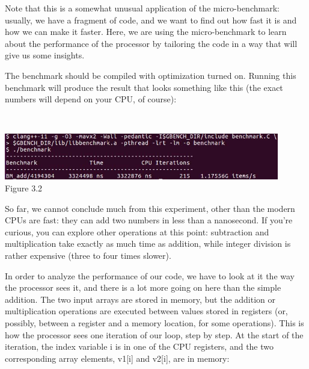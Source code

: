 Note that this is a somewhat unusual application of the micro-benchmark: usually, we have a fragment of code, and we want to find out how fast it is and how we can make it faster. Here, we are using the micro-benchmark to learn about the performance of the processor by tailoring the code in a way that will give us some insights.

The benchmark should be compiled with optimization turned on. Running this benchmark will produce the result that looks something like this (the exact numbers will depend on your CPU, of course):

\hspace*{\fill} \\ %
\begin{center}
\includegraphics[width=0.9\textwidth]{content/1/chapter3/images/2.jpg}\\
Figure 3.2
\end{center}

So far, we cannot conclude much from this experiment, other than the modern CPUs are fast: they can add two numbers in less than a nanosecond. If you're curious, you can explore other operations at this point: subtraction and multiplication take exactly as much time as addition, while integer division is rather expensive (three to four times slower).

In order to analyze the performance of our code, we have to look at it the way the processor sees it, and there is a lot more going on here than the simple addition. The two input arrays are stored in memory, but the addition or multiplication operations are executed between values stored in registers (or, possibly, between a register and a memory location, for some operations). This is how the processor sees one iteration of our loop, step by step. At the start of the iteration, the index variable i is in one of the CPU registers, and the two corresponding array elements, v1[i] and v2[i], are in memory:

